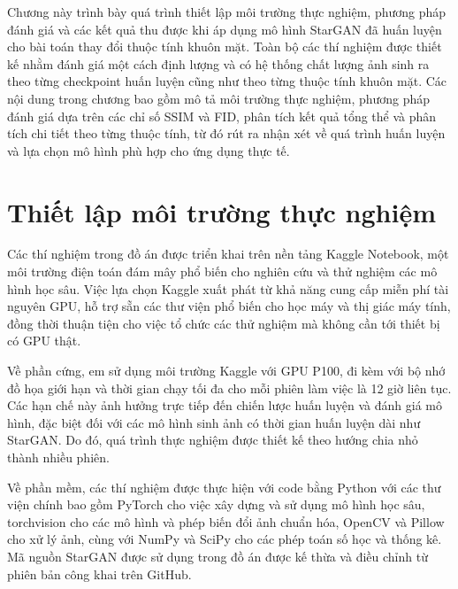 \documentclass[../DoAn.tex]{subfiles}
\begin{document}
Chương này trình bày quá trình thiết lập môi trường thực nghiệm, phương pháp đánh giá và các kết quả thu được khi áp dụng mô hình StarGAN đã huấn luyện cho bài toán thay đổi thuộc tính khuôn mặt. Toàn bộ các thí nghiệm được thiết kế nhằm đánh giá một cách định lượng và có hệ thống chất lượng ảnh sinh ra theo từng checkpoint huấn luyện cũng như theo từng thuộc tính khuôn mặt. Các nội dung trong chương bao gồm mô tả môi trường thực nghiệm, phương pháp đánh giá dựa trên các chỉ số SSIM và FID, phân tích kết quả tổng thể và phân tích chi tiết theo từng thuộc tính, từ đó rút ra nhận xét về quá trình huấn luyện và lựa chọn mô hình phù hợp cho ứng dụng thực tế.

\section{Thiết lập môi trường thực nghiệm}
\label{section:5.1}

Các thí nghiệm trong đồ án được triển khai trên nền tảng Kaggle Notebook, một môi trường điện toán đám mây phổ biến cho nghiên cứu và thử nghiệm các mô hình học sâu. Việc lựa chọn Kaggle xuất phát từ khả năng cung cấp miễn phí tài nguyên GPU, hỗ trợ sẵn các thư viện phổ biến cho học máy và thị giác máy tính, đồng thời thuận tiện cho việc tổ chức các thử nghiệm mà không cần tới thiết bị có GPU thật.

Về phần cứng, em sử dụng môi trường Kaggle với GPU P100, đi kèm với bộ nhớ đồ họa giới hạn và thời gian chạy tối đa cho mỗi phiên làm việc là 12 giờ liên tục. Các hạn chế này ảnh hưởng trực tiếp đến chiến lược huấn luyện và đánh giá mô hình, đặc biệt đối với các mô hình sinh ảnh có thời gian huấn luyện dài như StarGAN. Do đó, quá trình thực nghiệm được thiết kế theo hướng chia nhỏ thành nhiều phiên.

Về phần mềm, các thí nghiệm được thực hiện với code bằng Python với các thư viện chính bao gồm PyTorch cho việc xây dựng và sử dụng mô hình học sâu, torchvision cho các mô hình và phép biến đổi ảnh chuẩn hóa, OpenCV và Pillow cho xử lý ảnh, cùng với NumPy và SciPy cho các phép toán số học và thống kê. Mã nguồn StarGAN được sử dụng trong đồ án được kế thừa và điều chỉnh từ phiên bản công khai trên GitHub.
\end{document}
